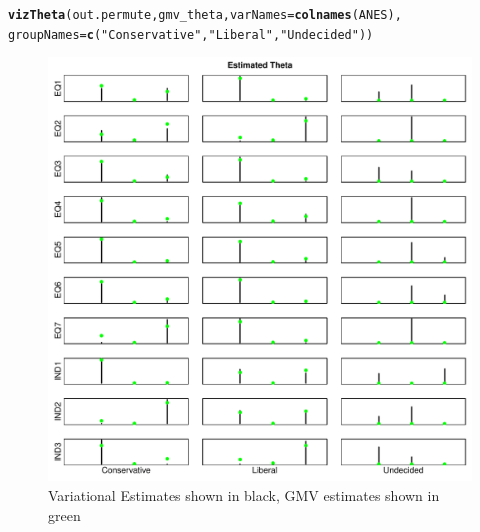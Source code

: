 \documentclass{article}\usepackage[]{graphicx}\usepackage[]{color}
\makeatletter
\def\maxwidth{ %
  \ifdim\Gin@nat@width>\linewidth
    \linewidth
  \else
    \Gin@nat@width
  \fi
}
\newcommand{\hlstr}[1]{\textcolor[rgb]{0.192,0.494,0.8}{#1}}%
\newcommand{\hlstd}[1]{\textcolor[rgb]{0.345,0.345,0.345}{#1}}%
\newcommand{\hlkwc}[1]{\textcolor[rgb]{0.333,0.667,0.333}{#1}}%
\newcommand{\hlkwd}[1]{\textcolor[rgb]{0.737,0.353,0.396}{\textbf{#1}}}%
\newenvironment{kframe}{%
 \def\at@end@of@kframe{}%
 \ifinner\ifhmode%
  \def\at@end@of@kframe{\end{minipage}}%
  \begin{minipage}{\columnwidth}%
 \fi\fi%
 \def\FrameCommand##1{\hskip\@totalleftmargin \hskip-\fboxsep
 \colorbox{shadecolor}{##1}\hskip-\fboxsep
     \hskip-\linewidth \hskip-\@totalleftmargin \hskip\columnwidth}%
 \MakeFramed {\advance\hsize-\width
   \@totalleftmargin\z@ \linewidth\hsize
   \@setminipage}}%
 {\par\unskip\endMakeFramed%
 \at@end@of@kframe}
\newenvironment{knitrout}{}{} %
\renewenvironment{knitrout}{\begin{singlespace}}{\end{singlespace}}
\makeatother
\begin{document}
\begin{knitrout}
\color{fgcolor}\begin{kframe}
\begin{alltt}
\hlkwd{vizTheta}\hlstd{(out.permute, gmv_theta,} \hlkwc{varNames} \hlstd{=} \hlkwd{colnames}\hlstd{(ANES),}
         \hlkwc{groupNames} \hlstd{=} \hlkwd{c}\hlstd{(}\hlstr{"Conservative"}\hlstd{,} \hlstr{"Liberal"}\hlstd{,} \hlstr{"Undecided"}\hlstd{))}
\end{alltt}
\end{kframe}\begin{figure}

{\centering \includegraphics[width=\maxwidth]{figure/thetaPlot-1} 

}

\caption[Variational Estimates shown in black, GMV estimates shown in green]{Variational Estimates shown in black, GMV estimates shown in green\label{fig:thetaPlot1}}
\end{figure}

\begin{figure}


\end{figure}
\end{knitrout}
\end{document}
